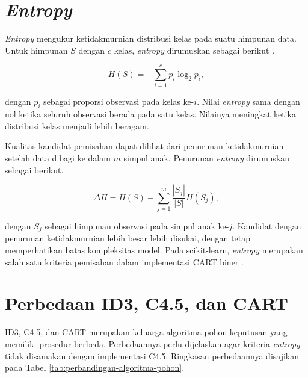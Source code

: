 \section{\textit{Entropy}}

\textit{Entropy} mengukur ketidakmurnian distribusi kelas pada suatu himpunan data. Untuk himpunan $S$ dengan $c$ kelas, \textit{entropy} dirumuskan sebagai berikut \cite{Quinlan1986,JamesEtAl2023}.

\begin{equation}
H(S)=-\sum_{i=1}^{c}p_i\log_2 p_i,
\label{eq:entropy-bab-dua}
\end{equation}

dengan $p_i$ sebagai proporsi observasi pada kelas ke-$i$. Nilai \textit{entropy} sama dengan nol ketika seluruh observasi berada pada satu kelas. Nilainya meningkat ketika distribusi kelas menjadi lebih beragam.

Kualitas kandidat pemisahan dapat dilihat dari penurunan ketidakmurnian setelah data dibagi ke dalam $m$ simpul anak. Penurunan \textit{entropy} dirumuskan sebagai berikut.

\begin{equation}
\Delta H=H(S)-\sum_{j=1}^{m}\frac{|S_j|}{|S|}H(S_j),
\label{eq:penurunan-entropy}
\end{equation}

dengan $S_j$ sebagai himpunan observasi pada simpul anak ke-$j$. Kandidat dengan penurunan ketidakmurnian lebih besar lebih disukai, dengan tetap memperhatikan batas kompleksitas model. Pada scikit-learn, \textit{entropy} merupakan salah satu kriteria pemisahan dalam implementasi CART biner \cite{ScikitLearnTreeGuide}.

\section{Perbedaan ID3, C4.5, dan CART}

ID3, C4.5, dan CART merupakan keluarga algoritma pohon keputusan yang memiliki prosedur berbeda. Perbedaannya perlu dijelaskan agar kriteria \textit{entropy} tidak disamakan dengan implementasi C4.5. Ringkasan perbedaannya disajikan pada Tabel \ref{tab:perbandingan-algoritma-pohon}.

